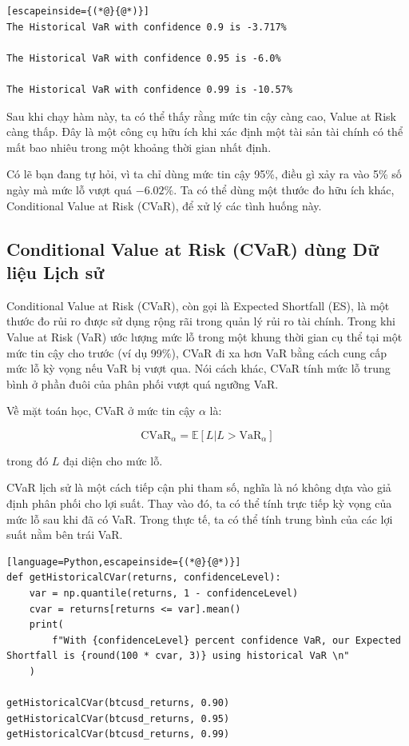\begin{lstlisting}[escapeinside={(*@}{@*)}]
The Historical VaR with confidence 0.9 is -3.717%

The Historical VaR with confidence 0.95 is -6.0%

The Historical VaR with confidence 0.99 is -10.57%
\end{lstlisting}

Sau khi chạy hàm này, ta có thể thấy rằng mức tin cậy càng cao, Value at Risk càng thấp. Đây là một công cụ hữu ích khi xác định một tài sản tài chính có thể mất bao nhiêu trong một khoảng thời gian nhất định.

Có lẽ bạn đang tự hỏi, vì ta chỉ dùng mức tin cậy 95\%, điều gì xảy ra vào 5\% số ngày mà mức lỗ vượt quá $-6.02\%$. Ta có thể dùng một thước đo hữu ích khác, Conditional Value at Risk (CVaR), để xử lý các tình huống này.

\subsection{Conditional Value at Risk (CVaR) dùng Dữ liệu Lịch sử}

Conditional Value at Risk (CVaR), còn gọi là Expected Shortfall (ES), là một thước đo rủi ro được sử dụng rộng rãi trong quản lý rủi ro tài chính. Trong khi Value at Risk (VaR) ước lượng mức lỗ trong một khung thời gian cụ thể tại một mức tin cậy cho trước (ví dụ 99\%), CVaR đi xa hơn VaR bằng cách cung cấp mức lỗ kỳ vọng nếu VaR bị vượt qua. Nói cách khác, CVaR tính mức lỗ trung bình ở phần đuôi của phân phối vượt quá ngưỡng VaR.

Về mặt toán học, CVaR ở mức tin cậy $\alpha$ là:

$$
\text{CVaR}_{\alpha} = \mathbb{E}[L|L>\text{VaR}_{\alpha}]
$$

trong đó $L$ đại diện cho mức lỗ.

CVaR lịch sử là một cách tiếp cận phi tham số, nghĩa là nó không dựa vào giả định phân phối cho lợi suất. Thay vào đó, ta có thể tính trực tiếp kỳ vọng của mức lỗ sau khi đã có VaR. Trong thực tế, ta có thể tính trung bình của các lợi suất nằm bên trái VaR.

\begin{lstlisting}[language=Python,escapeinside={(*@}{@*)}]
def getHistoricalCVar(returns, confidenceLevel):
    var = np.quantile(returns, 1 - confidenceLevel)
    cvar = returns[returns <= var].mean()
    print(
        f"With {confidenceLevel} percent confidence VaR, our Expected Shortfall is {round(100 * cvar, 3)} using historical VaR \n"
    )

getHistoricalCVar(btcusd_returns, 0.90)
getHistoricalCVar(btcusd_returns, 0.95)
getHistoricalCVar(btcusd_returns, 0.99)
\end{lstlisting}

